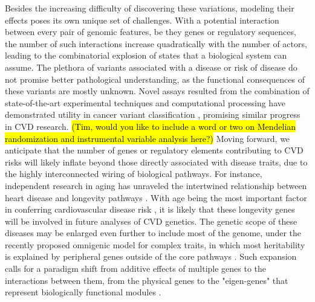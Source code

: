 \documentclass[letter]{bioinfo}
\begin{document}
Besides the increasing difficulty of discovering these variations, modeling their effects poses its own unique set of challenges. With a potential interaction between every pair of genomic features, be they genes or regulatory sequences, the number of such interactions increase quadratically with the number of actors, leading to the combinatorial explosion of states that a biological system can assume.  The plethora of variants associated with a disease or risk of disease do not promise better pathological understanding, as the functional consequences of these variants are mostly unknown. Novel assays resulted from the combination of state-of-the-art experimental techniques and computational processing have demonstrated utility in cancer variant classification \citep{Findlay:2018:Accurate}, promising similar progress in CVD research.
	\hl{(Tim, would you like to include a word or two on Mendelian randomization and instrumental variable analysis here?)}  
Moving forward, we anticipate that the number of genes or regulatory elements contributing to CVD risks will likely inflate beyond those directly associated with disease traits, due to the highly interconnected wiring of biological pathways.  For instance, independent research in aging has unraveled the intertwined relationship between heart disease and longevity pathways \citep{North:2012:Intersection}.  With age being the most important factor in conferring cardiovascular disease risk \citep{Steenman:2017:Cardiac}, it is likely that these longevity genes will be involved in future analyses of CVD genetics. The genetic scope of these diseases may be enlarged even further to include most of the genome, under the recently proposed omnigenic model for complex traits, in which most heritability is explained by peripheral genes outside of the core pathways \citep{Boyle:2017:Expanded}. Such expansion calls for a paradigm shift from additive effects of multiple genes to the interactions between them, from the physical genes to the "eigen-genes" that represent biologically functional modules \citep{Weiss:2012:Good}.
	
\end{document}
